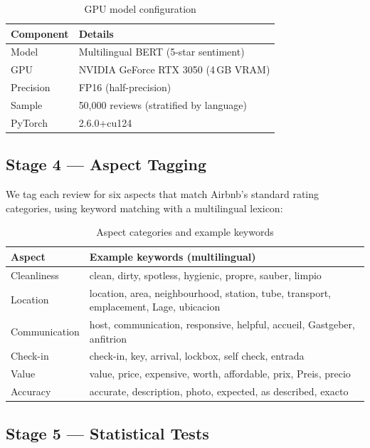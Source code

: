 \documentclass[12pt,a4paper]{article}
\begin{document}
\begin{table}[H]
\centering
\caption{GPU model configuration}
\begin{tabular}{ll}
\toprule
\textbf{Component} & \textbf{Details} \\
\midrule
Model       & Multilingual BERT (5-star sentiment) \\
GPU         & NVIDIA GeForce RTX 3050 (4\,GB VRAM) \\
Precision   & FP16 (half-precision) \\
Sample      & 50,000 reviews (stratified by language) \\
PyTorch     & 2.6.0+cu124 \\
\bottomrule
\end{tabular}
\end{table}

\subsection{Stage 4 --- Aspect Tagging}

We tag each review for six aspects that match Airbnb's standard rating categories, using keyword matching with a multilingual lexicon:

\begin{table}[H]
\centering
\caption{Aspect categories and example keywords}
\begin{tabular}{lp{10cm}}
\toprule
\textbf{Aspect} & \textbf{Example keywords (multilingual)} \\
\midrule
Cleanliness   & clean, dirty, spotless, hygienic, propre, sauber, limpio \\
Location      & location, area, neighbourhood, station, tube, transport, emplacement, Lage, ubicacion \\
Communication & host, communication, responsive, helpful, accueil, Gastgeber, anfitrion \\
Check-in      & check-in, key, arrival, lockbox, self check, entrada \\
Value         & value, price, expensive, worth, affordable, prix, Preis, precio \\
Accuracy      & accurate, description, photo, expected, as described, exacto \\
\bottomrule
\end{tabular}
\end{table}

\subsection{Stage 5 --- Statistical Tests}
\end{document}
